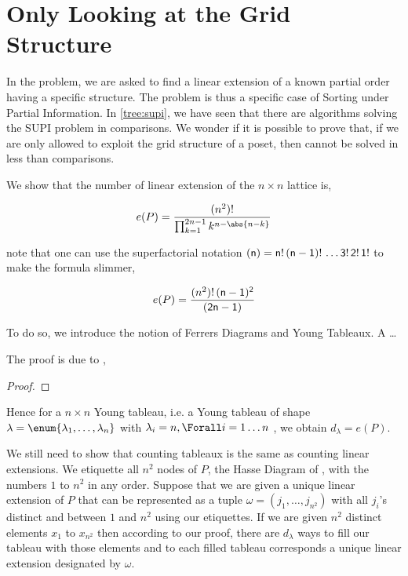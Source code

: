 \section{Only Looking at the Grid Structure}
\label{tree:xy:grid}

In the \XY problem, we are asked to find a linear extension of a known partial
order having a specific structure. The \XY problem is thus a specific case of
Sorting under Partial Information. In \ref{tree:supi}, we have seen that there
are algorithms solving the SUPI problem in  comparisons. We
wonder if it is possible to prove that, if we are only allowed to exploit the
grid structure of a \XY poset, then \XY cannot be solved in less than  comparisons.

We show that the number of linear extension of the \( n \times n \) lattice is,

\begin{displaymath}
e(P) = \frac{(n^2)!}{\prod_{k=1}^{2n-1} k^{n - \abs{n-k}}}
\end{displaymath}

note that one can use the superfactorial notation
\( \sf(n) = n!\,(n-1)!\,\ldots 3!\,2!\,1! \)
to make the formula slimmer,

\begin{displaymath}
e(P) = \frac{(n^2)! \, \sf(n-1)^2}{\sf(2n-1)}
\end{displaymath}

To do so, we introduce the notion of Ferrers Diagrams and Young Tableaux. A
\dots

The proof is due to \citet*{greene:1979},

\begin{proof}

\end{proof}

Hence for a \( n \times n \) Young tableau, i.e. a Young tableau of shape
\( \lambda = \enum{ \lambda_1 , \ldots , \lambda_n } \)
with
\( \lambda_i = n, \Forall i = 1 \ldots n \)
, we obtain
\( d_{\lambda} = e(P) \).

We still need to show that counting tableaux is the same as counting linear
extensions. We etiquette all \( n^2 \) nodes of \(P\), the Hasse Diagram of
\XY, with the numbers \(1\) to \( n^2 \) in any order. Suppose that we are
given a unique linear extension of \(P\) that can be represented as a tuple
\( \omega = ( j_1 , \ldots , j_{n^2}) \)
with all \( j_i \)'s distinct and between \(1\) and \( n^2 \) using our
etiquettes. If we are given \( n^2 \) distinct elements \( x_1 \) to
\( x_{n^2} \) then according to our proof, there are \( d_{\lambda} \) ways to
fill our tableau with those elements and to each filled tableau corresponds a
unique linear extension designated by \(\omega\).

